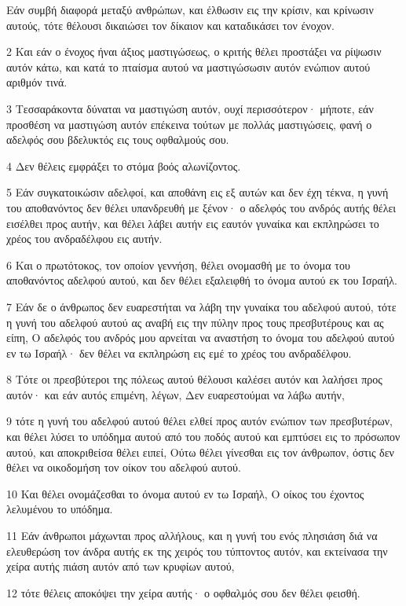 \par Εάν συμβή διαφορά μεταξύ ανθρώπων, και έλθωσιν εις την κρίσιν, και κρίνωσιν αυτούς, τότε θέλουσι δικαιώσει τον δίκαιον και καταδικάσει τον ένοχον.
\par 2 Και εάν ο ένοχος ήναι άξιος μαστιγώσεως, ο κριτής θέλει προστάξει να ρίψωσιν αυτόν κάτω, και κατά το πταίσμα αυτού να μαστιγώσωσιν αυτόν ενώπιον αυτού αριθμόν τινά.
\par 3 Τεσσαράκοντα δύναται να μαστιγώση αυτόν, ουχί περισσότερον· μήποτε, εάν προσθέση να μαστιγώση αυτόν επέκεινα τούτων με πολλάς μαστιγώσεις, φανή ο αδελφός σου βδελυκτός εις τους οφθαλμούς σου.
\par 4 Δεν θέλεις εμφράξει το στόμα βοός αλωνίζοντος.
\par 5 Εάν συγκατοικώσιν αδελφοί, και αποθάνη εις εξ αυτών και δεν έχη τέκνα, η γυνή του αποθανόντος δεν θέλει υπανδρευθή με ξένον· ο αδελφός του ανδρός αυτής θέλει εισέλθει προς αυτήν, και θέλει λάβει αυτήν εις εαυτόν γυναίκα και εκπληρώσει το χρέος του ανδραδέλφου εις αυτήν.
\par 6 Και ο πρωτότοκος, τον οποίον γεννήση, θέλει ονομασθή με το όνομα του αποθανόντος αδελφού αυτού, και δεν θέλει εξαλειφθή το όνομα αυτού εκ του Ισραήλ.
\par 7 Εάν δε ο άνθρωπος δεν ευαρεστήται να λάβη την γυναίκα του αδελφού αυτού, τότε η γυνή του αδελφού αυτού ας αναβή εις την πύλην προς τους πρεσβυτέρους και ας είπη, Ο αδελφός του ανδρός μου αρνείται να αναστήση το όνομα του αδελφού αυτού εν τω Ισραήλ· δεν θέλει να εκπληρώση εις εμέ το χρέος του ανδραδέλφου.
\par 8 Τότε οι πρεσβύτεροι της πόλεως αυτού θέλουσι καλέσει αυτόν και λαλήσει προς αυτόν· και εάν αυτός επιμένη, λέγων, Δεν ευαρεστούμαι να λάβω αυτήν,
\par 9 τότε η γυνή του αδελφού αυτού θέλει ελθεί προς αυτόν ενώπιον των πρεσβυτέρων, και θέλει λύσει το υπόδημα αυτού από του ποδός αυτού και εμπτύσει εις το πρόσωπον αυτού, και αποκριθείσα θέλει ειπεί, Ούτω θέλει γίνεσθαι εις τον άνθρωπον, όστις δεν θέλει να οικοδομήση τον οίκον του αδελφού αυτού.
\par 10 Και θέλει ονομάζεσθαι το όνομα αυτού εν τω Ισραήλ, Ο οίκος του έχοντος λελυμένου το υπόδημα.
\par 11 Εάν άνθρωποι μάχωνται προς αλλήλους, και η γυνή του ενός πλησιάση διά να ελευθερώση τον άνδρα αυτής εκ της χειρός του τύπτοντος αυτόν, και εκτείνασα την χείρα αυτής πιάση αυτόν από των κρυφίων αυτού,
\par 12 τότε θέλεις αποκόψει την χείρα αυτής· ο οφθαλμός σου δεν θέλει φεισθή.
